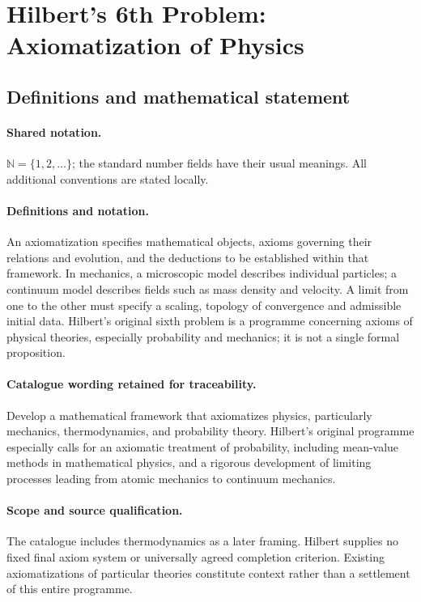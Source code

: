 \documentclass[11pt]{article}
\begin{document}
\section{Hilbert's 6th Problem: Axiomatization of Physics}\label{statement}

\subsection{Definitions and mathematical statement}

\paragraph{Shared notation.}$\mathbb N=\{1,2,\ldots\}$; the standard number fields have their usual meanings. All additional conventions are stated locally.


\paragraph{Definitions and notation.}An axiomatization specifies mathematical objects, axioms governing their relations and evolution, and the deductions to be established within that framework. In mechanics, a microscopic model describes individual particles; a continuum model describes fields such as mass density and velocity. A limit from one to the other must specify a scaling, topology of convergence and admissible initial data. Hilbert’s original sixth problem is a programme concerning axioms of physical theories, especially probability and mechanics; it is not a single formal proposition.

\paragraph{Catalogue wording retained for traceability.}
Develop a mathematical framework that axiomatizes physics, particularly mechanics, thermodynamics, and probability theory. Hilbert’s original programme especially calls for an axiomatic treatment of probability, including mean-value methods in mathematical physics, and a rigorous development of limiting processes leading from atomic mechanics to continuum mechanics.
\paragraph{Scope and source qualification.}The catalogue includes thermodynamics as a later framing. Hilbert supplies no fixed final axiom system or universally agreed completion criterion. Existing axiomatizations of particular theories constitute context rather than a settlement of this entire programme.
\end{document}
